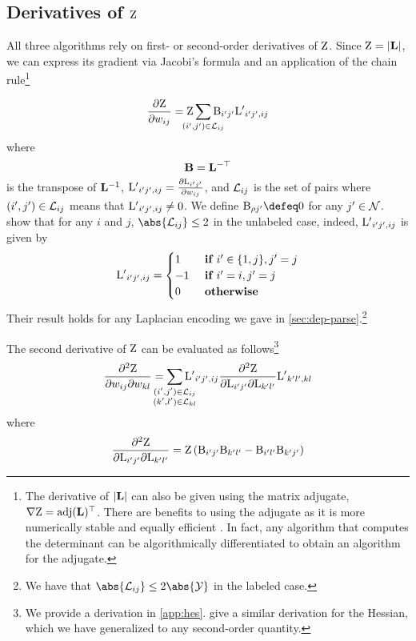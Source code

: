 \documentclass[11pt,a4paper]{article}
\theoremstyle{definition}
\begin{document}
\subsection{Derivatives of ${\mathrm{Z}}$}
\label{sec:derivatives-of-Z}
All three algorithms rely on first- or second-order derivatives of ${\mathrm{Z}}$.
Since ${\mathrm{Z}} = \left\lvert {\mathbf{L}} \right\rvert$, we can express its gradient via Jacobi's formula and an application of the chain rule\footnote{The derivative of $\left\lvert {\mathbf{L}} \right\rvert$ can also be given using the matrix adjugate, $\nabla {\mathrm{Z}} = \mathrm{adj}({\mathbf{L}})^{\top}$.
There are benefits to using the adjugate as it is more numerically stable and equally efficient \citep{stewart1998adjugate}.
In fact, any algorithm that computes the determinant can be algorithmically differentiated to obtain an algorithm for the adjugate.}

\begin{equation}\label{eq:dz}
    \frac{\partial \wbar}{\partial \wedge{ij}} = \wbar \smashoperator{\sum_{(i',j')\in\col{i}{j}}}\cachedelem{i'j'}\dlap{i'j'}{ij}
\end{equation}
where
\begin{equation}\label{eq:cached}
    {\mathbf{B}}={\mathbf{L}}^{-\top}
\end{equation}
is the transpose of ${\mathbf{L}}^{-1}$, ${{\mathrm{L}'}_{i'j',ij}}=\frac{\partial{\mathrm{L}_{i'j'}}}{\partial{w_{ij}}}$, and ${\mathcal{L}_{ij}}$ is the set of pairs where $(i', j')\in{\mathcal{L}_{ij}}$ means that ${{\mathrm{L}'}_{i'j',ij}}\neq 0$.
We define $\cachedelem{\root j'} \defeq 0$ for any $j' \in {\mathcal{N}}$.
\citet{koo-et-al-2007} show that for any $i$ and $j$, $\abs{\col{i}{j}}\le 2$ in the unlabeled case, indeed, ${{\mathrm{L}'}_{i'j',ij}}$ is given by
\begin{equation}\label{eq:dlap}
    {{\mathrm{L}'}_{i'j',ij}}=\begin{cases}
    1 & \textbf{ if } i'\in\{1,j\}, j'=j \\
    -1 & \textbf{ if } i'=i,j'=j \\
    0 & \textbf{ otherwise}
    \end{cases}
\end{equation}
Their result holds for any Laplacian encoding we gave in \cref{sec:dep-parse}.\footnote{We have that $\abs{\col{i}{j}}\le 2\abs{\lab}$ in the labeled case.}

The second derivative of ${\mathrm{Z}}$ can be evaluated as follows\footnote{We provide a derivation in \cref{app:hes}. \citet{druck09covariance} give a similar derivation for the Hessian, which we have generalized to any second-order quantity.}
\begin{equation}\label{eq:wbar-hes}
    \frac{\partial^2 \wbar}{\partial\wedge{ij}\partial\wedge{kl}} = \smashoperator{\sum_{\substack{(i', j')\in\col{i}{j} \\ (k', l')\in\col{k}{l}}}} \dlap{i'j'}{ij}\frac{\partial^2 \wbar}{\partial\lapelem{i'j'}\partial\lapelem{k'l'}}\dlap{k'l'}{kl}
\end{equation}
where
\begin{equation}\label{eq:dzdl}
    \frac{\partial^2 {\mathrm{Z}}}{\partial{\mathrm{L}_{i'j'}}\partial{\mathrm{L}_{k'l'}}} = {\mathrm{Z}}\left({\mathrm{B}_{i'j'}}{\mathrm{B}_{k'l'}}-{\mathrm{B}_{i'l'}}{\mathrm{B}_{k'j'}}\right)
\end{equation}
\end{document}
